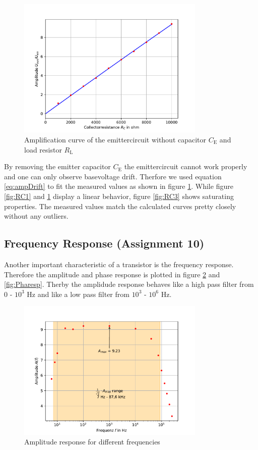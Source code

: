 \documentclass[11pt, a4paper]{article}
\begin{document}
\begin{figure}[h]
    \centering
    \includegraphics[width=0.8\textwidth]{plots/RC2.pdf}
    \caption{Amplification curve of the emittercircuit without capacitor $C_{\text{E}}$ and load resistor $R_{\text{L}}$}
    \label{fig:RC2}
\end{figure}
By removing the emitter capacitor $C_{\text{E}}$ the emittercircuit cannot work properly and one can only observe basevoltage drift. Therfore we used equation \ref{eq:ampDrift} to fit the measured values as shown in figure \ref{fig:RC2}.
While figure \ref{fig:RC1} and \ref{fig:RC2} display a linear behavior, figure \ref{fig:RC3} shows saturating properties.
The measured values match the calculated curves pretty closely without any outliers.

\subsection{Frequency Response (Assignment 10)}
Another important characteristic of a transistor is the frequency response. Therefore the amplitude and phase response is plotted in figure \ref{fig:Ampresp} and \ref{fig:Pharesp}.
Therby the amplidude response behaves like a high pass filter from 0 - $10^3$ \si{\hertz} and like a low pass filter from $10^3$ - $10^6$ \si{\hertz}. 


\begin{figure}[h]
    \centering
    \includegraphics[width=0.8\textwidth]{plots/Amplitudengang.pdf}
    \caption{Amplitude response for different frequencies}
    \label{fig:Ampresp}
\end{figure}
\end{document}
